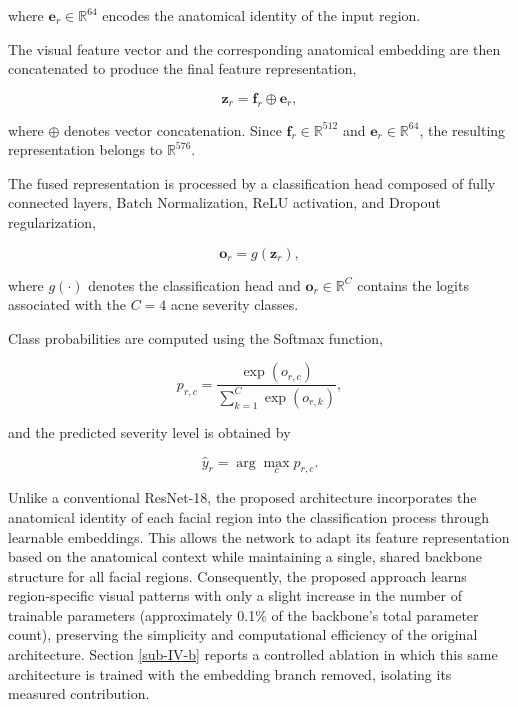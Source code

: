 \documentclass[conference]{IEEEtran}
\begin{document}
where $\mathbf{e}_r\in\mathbb{R}^{64}$ encodes the anatomical identity of the input region.

The visual feature vector and the corresponding anatomical embedding are then concatenated to produce the final feature representation,

\begin{equation}
\mathbf{z}_r=
\mathbf{f}_r
\oplus
\mathbf{e}_r,
\label{eq:fusion}
\end{equation}

where $\oplus$ denotes vector concatenation. Since $\mathbf{f}_r\in\mathbb{R}^{512}$ and $\mathbf{e}_r\in\mathbb{R}^{64}$, the resulting representation belongs to $\mathbb{R}^{576}$.

The fused representation is processed by a classification head composed of fully connected layers, Batch Normalization, ReLU activation, and Dropout regularization,

\begin{equation}
\mathbf{o}_r=g(\mathbf{z}_r),
\label{eq:classifier}
\end{equation}

where $g(\cdot)$ denotes the classification head and $\mathbf{o}_r\in\mathbb{R}^{C}$ contains the logits associated with the $C=4$ acne severity classes.

Class probabilities are computed using the Softmax function,

\begin{equation}
p_{r,c}=
\frac{\exp(o_{r,c})}
{\sum_{k=1}^{C}\exp(o_{r,k})},
\label{eq:softmax}
\end{equation}

and the predicted severity level is obtained by

\begin{equation}
\hat{y}_r=
\arg\max_c p_{r,c}.
\label{eq:prediction}
\end{equation}

Unlike a conventional ResNet-18, the proposed architecture incorporates the anatomical identity of each facial region into the classification process through learnable embeddings. This allows the network to adapt its feature representation based on the anatomical context while maintaining a single, shared backbone structure for all facial regions. Consequently, the proposed approach learns region-specific visual patterns with only a slight increase in the number of trainable parameters (approximately 0.1\% of the backbone's total parameter count), preserving the simplicity and computational efficiency of the original architecture. Section \ref{sub-IV-b} reports a controlled ablation in which this same architecture is trained with the embedding branch removed, isolating its measured contribution.
\end{document}
